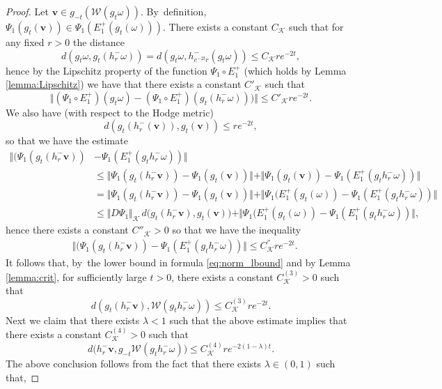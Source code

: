 \documentclass[10pt]{amsart}
\theoremstyle{plain}
\theoremstyle{definition}
\numberwithin{equation}{subsection}
\newcommand\cK{\mathcal{K}}
\newcommand\cW{\mathcal{W}}
\newcommand{\bfv}{\boldsymbol{v}}
\begin{document}
\begin{proof}
Let ${\bfv} \in g_{-t} \left(\cW(g_{t}\omega)\right)$. By~definition,
$\Psi_1 (g_{t} ({\bfv})) \in \Psi_1 (E^+_1(g_{t}(\omega)))$. There exists a constant $C_\cK$ such that for any fixed $r>0$
the distance
\[
d(g_{t}\omega, g_{t} (h^-_r \omega))=
d(g_{t}\omega, h^-_{e^{-2t} r} (g_{t} \omega)) \leq C_\cK r e^{-2t},
\]
hence by the Lipschitz property of the function
$\Psi_1 \circ E^+_1$ (which holds by Lemma
\ref{lemma:Lipschitz}) we have that there exists
a constant $C'_\cK$ such that
\[
\bigl\Vert (\Psi_1 \circ E^+_1)(g_{t}\omega) - (\Psi_1 \circ E^+_1) (g_{t} (h^-_r \omega)))\bigr\Vert \leq C'_\cK r e^{-2t}.
\]
We also have (with respect to the Hodge metric)\vspace*{-3pt}
\[
d \left(g_{t} (h^-_r ({\bfv})), g_{t} ({\bfv})\right) \leq r e^{-2t},
\]
so that we have the estimate
\[
\begin{aligned}
\Vert (\Psi_1(g_{t} (h^-_r {\bfv})) &-
\Psi_1(E^+_1 (g_{t} h^-_r \omega)) \Vert \\
& \leq
\Vert \Psi_1(g_{t} (h^-_r {\bfv})) -
\Psi_1(g_{t} ({\bfv})) \Vert +
\Vert \Psi_1(g_{t} ({\bfv})) - \Psi_1(E^+_1 (g_{t} h^-_r \omega)) \Vert \\
& =
\Vert \Psi_1(g_{t} (h^-_r {\bfv})) -
\Psi_1(g_{t} ({\bfv})) \Vert +
\Vert \Psi_1(E^+_1 (g_{t} (\omega)) - \Psi_1(E^+_1 (g_{t} h^-_r \omega)) \Vert \\
& \leq \Vert D\Psi_1 \Vert_\cK\, d\Big(g_{t} (h^-_r {\bfv}), g_{t} ({\bfv})\Big) +
\Vert \Psi_1(E^+_1 (g_{t} (\omega)) - \Psi_1(E^+_1 (g_{t} h^-_r \omega)) \Vert,
\end{aligned}
\]
hence there exists a constant $C''_\cK>0$ so that we have the inequality\vspace*{-3pt}
\[
\begin{aligned}
&\Vert (\Psi_1(g_{t} (h^-_r {\bfv})) -
\Psi_1(E^+_1 (g_{t} h^-_r \omega)) \Vert \leq C^{''}_\cK r e^{-2t}.
\end{aligned}
\]
It follows that, by~the lower bound in formula \eqref{eq:norm_lbound} and by Lemma \ref{lemma:crit}, for sufficiently large $t>0$, there exists a constant $C^{(3)}_\cK>0$ such that\vspace*{-3pt}
\[
d \left(g_{t} (h^-_r {\bfv}), \cW (g_{t} h^-_r \omega)\right) \leq C^{(3)}_\cK r e^{-2t}.
\]
Next we claim that there exists $\lambda <1$ such that the above estimate implies that there exists
a constant $C^{(4)}_\cK >0$ such that\vspace*{-3pt}
\[
d\big(h^-_r {\bfv}, g_{-t}\cW (g_{t} h^-_r \omega)\big) \leq C^{(4)}_\cK r e^{-2(1-\lambda)t}.
\]
The above conclusion follows from the fact that there exists $\lambda \in (0,1)$ such that,

\end{proof}
\end{document}
